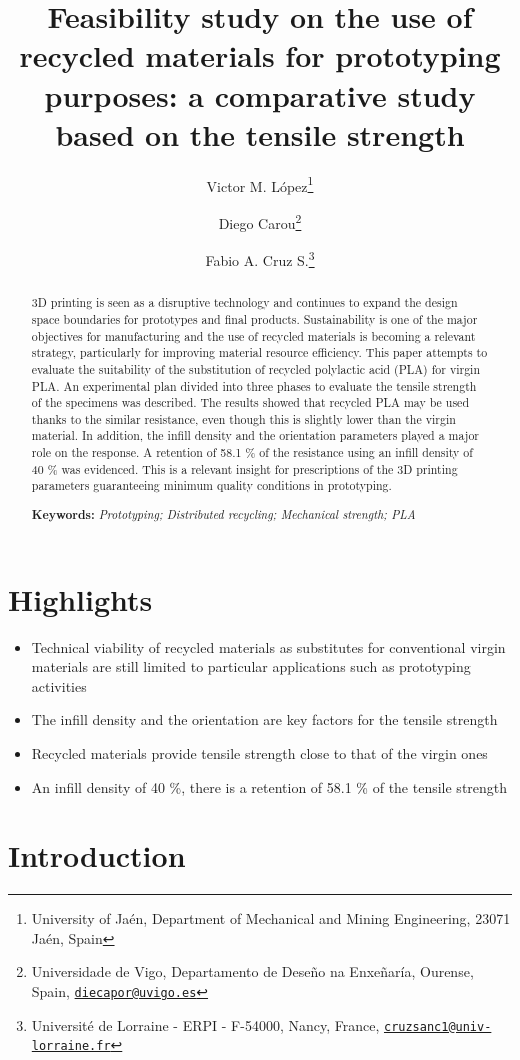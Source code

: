 \documentclass[
  12pt]{article}
\title{Feasibility study on the use of recycled materials for prototyping purposes: a comparative study based on the tensile strength}
\author{Victor M. López\footnote{University of Jaén, Department of Mechanical and Mining Engineering, 23071 Jaén, Spain} \and Diego Carou\footnote{Universidade de Vigo, Departamento de Deseño na Enxeñaría, Ourense, Spain, \href{mailto:diecapor@uvigo.es}{\nolinkurl{diecapor@uvigo.es}}} \and Fabio A. Cruz S.\footnote{Université de Lorraine - ERPI - F-54000, Nancy, France, \href{mailto:cruzsanc1@univ-lorraine.fr}{\nolinkurl{cruzsanc1@univ-lorraine.fr}}}}
\date{}
\providecommand{\tightlist}{%
  \setlength{\itemsep}{0pt}\setlength{\parskip}{0pt}}
\def\tightlist{}
\begin{document}
\maketitle
\begin{abstract}
3D printing is seen as a disruptive technology and continues to expand the design space boundaries for prototypes and final products. Sustainability is one of the major objectives for manufacturing and the use of recycled materials is becoming a relevant strategy, particularly for improving material resource efficiency. This paper attempts to evaluate the suitability of the substitution of recycled polylactic acid (PLA) for virgin PLA. An experimental plan divided into three phases to evaluate the tensile strength of the specimens was described. The results showed that recycled PLA may be used thanks to the similar resistance, even though this is slightly lower than the virgin material. In addition, the infill density and the orientation parameters played a major role on the response. A retention of 58.1 \% of the resistance using an infill density of 40 \% was evidenced. This is a relevant insight for prescriptions of the 3D printing parameters guaranteeing minimum quality conditions in prototyping.

\textbf{Keywords:} \emph{Prototyping; Distributed recycling; Mechanical strength; PLA}
\end{abstract}

\section*{Highlights}

\begin{itemize}
\tightlist
\item
  Technical viability of recycled materials as substitutes for conventional virgin materials are still limited to particular applications such as prototyping activities
\item
  The infill density and the orientation are key factors for the tensile strength
\item
  Recycled materials provide tensile strength close to that of the virgin ones
\item
  An infill density of 40 \%, there is a retention of 58.1 \% of the tensile strength
\end{itemize}

\hypertarget{introduction}{%
\section{Introduction}\label{introduction}}
\end{document}
